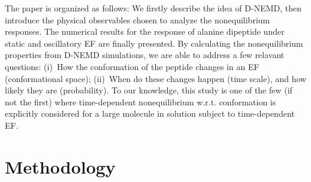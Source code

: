 \documentclass[a4paper,preprint,unsortedaddress,onecolumn]{revtex4-1}
\begin{document}
The paper is organized as follows:
We firstly describe the idea of D-NEMD, then
introduce the physical
observables chosen to analyze the nonequilibrium responses.
The numerical results for the response of alanine
dipeptide under static and oscillatory EF are
finally presented. By calculating the nonequilibrium properties from D-NEMD
simulations, we are able to address
a few relavant questions: (i)~How the conformation of the peptide
changes in an EF (conformational space);
(ii)~When do these changes happen (time scale),
and how likely they are (probability). 
To our knowledge, this study is one of the few (if not the first)  where
time-dependent nonequilibrium w.r.t. conformation
is explicitly considered for a large molecule
in solution subject to time-dependent EF.



\section{Methodology}
\end{document}
